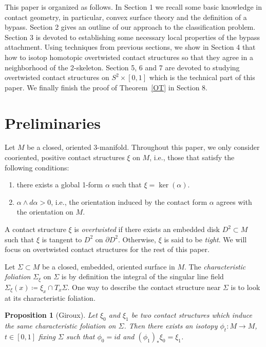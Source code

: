 \documentclass[12pt]{amsart}
\newtheorem{prop}[thm]{Proposition}
\theoremstyle{remark}
\newcommand{\bdry}{\partial}
\newcommand{\be}{\begin{enumerate}}
\newcommand{\ee}{\end{enumerate}}
\begin{document}
This paper is organized as follows. In Section 1 we recall some basic knowledge in contact geometry, in particular, convex surface theory and the definition of a bypass. Section 2 gives an outline of our approach to the classification problem. Section 3 is devoted to establishing some necessary local properties of the bypass attachment. Using techniques from previous sections, we show in Section 4 that how to isotop homotopic overtwisted contact structures so that they agree in a neighborhood of the 2-skeleton. Section 5, 6 and 7 are devoted to studying overtwisted contact structures on $S^2\times[0,1]$ which is the technical part of this paper. We finally finish the proof of Theorem~\ref{OT} in Section 8.

\section{Preliminaries}

Let $M$ be a closed, oriented 3-manifold. Throughout this paper, we only consider cooriented, positive contact structures $\xi$ on $M$, i.e., those that satisfy the following conditions:

\be

\item{there exists a global 1-form $\alpha$ such that $\xi=\ker(\alpha)$.}

\item{$\alpha \wedge d\alpha>0$, i.e., the orientation induced by the contact form $\alpha$ agrees with the orientation on $M$.}

\ee

A contact structure $\xi$ is {\em overtwisted} if there exists an embedded disk $D^2 \subset M$ such that $\xi$ is tangent to $D^2$ on $\bdry D^2$. Otherwise, $\xi$ is said to be {\em tight}. We will focus on overtwisted contact structures for the rest of this paper.

Let $\Sigma \subset M$ be a closed, embedded, oriented surface in $M$. The {\em characteristic foliation} $\Sigma_\xi$ on $\Sigma$ is by definition the integral of the singular line field $\Sigma_\xi(x)\coloneqq \xi_x \cap T_x\Sigma$. One way to describe the contact structure near $\Sigma$ is to look at its characteristic foliation.

\begin{prop}[Giroux]
Let $\xi_0$ and $\xi_1$ be two contact structures which induce the same characteristic foliation on $\Sigma$. Then there exists an isotopy $\phi_t:M \to M$, $t\in[0,1]$ fixing $\Sigma$ such that $\phi_0=id$ and $(\phi_1)_*\xi_0=\xi_1$.
\end{prop}
\end{document}
